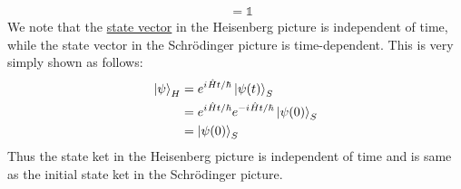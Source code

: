 \begin{enumerate}
\begin{align}
		&= \mathbb{1}
	\end{align}
	We note that the \underline{state vector} in the Heisenberg picture is independent of time, while the state vector in the Schr\"{o}dinger picture is time-dependent. This is very simply shown as follows:
	\begin{align}
		\ket{\psi}_H &= e^{{i\mkern1mu} \hat{H}t/\hbar} \ket{\psi(t)}_S \\
		&= e^{{i\mkern1mu} \hat{H}t/\hbar} e^{-{i\mkern1mu} \hat{H}t/\hbar} \ket{\psi(0)}_S\\
		&= \ket{\psi(0)}_S
	\end{align}
	Thus the state ket in the Heisenberg picture is independent of time and is same as the initial state ket in the Schr\"{o}dinger picture.
	
	\end{enumerate}


